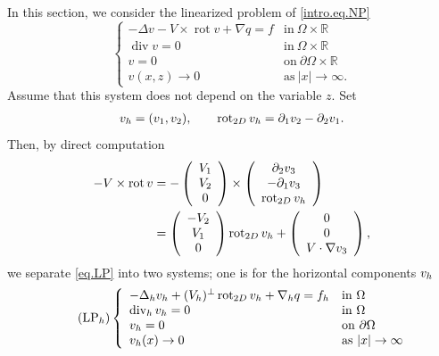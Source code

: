 \documentclass[11pt,a4paper]{article}
\numberwithin{equation}{section}
\newcommand{\R}{\mathbb{R}}
\newcommand{\opdiv}{\operatorname{div}}
\newcommand{\oprot}{\operatorname{rot}}
\newcommand{\h}{{\rm h}}
\begin{document}
In this section, we consider the linearized problem of \eqref{intro.eq.NP}
%
\begin{equation}\tag{LP}\label{eq.LP}
\left\{
\begin{array}{ll}
-\Delta v -V\times\oprot v + \nabla q = f&\mbox{in}\ \Omega\times\R \\
\opdiv v = 0&\mbox{in}\ \Omega\times\R \\
v= 0 &\mbox{on}\ \partial\Omega\times\R \\
v(x,z)\to0&\mbox{as}\ |x|\to\infty.
\end{array}\right.
\end{equation}
%
Assume that this system does not depend on the variable $z$. Set 
%
\begin{align}\label{def.op.h.1}
v_\h=(v_1,v_2), 
\qquad 
\oprot_{{\rm 2D}} v_\h 
= \partial_1 v_2 - \partial_2 v_1. 
\end{align}
%
Then, by direct computation 
%
\begin{align*}
-V\times\oprot v 
&= 
-\left(
\begin{array}{c}
V_1 \\
V_2  \\
0 
\end{array}
\right) 
\times 
\left(
\begin{array}{c}
\partial_2 v_3 \\
-\partial_1 v_3 \\
\oprot_{{\rm 2D}} v_\h 
\end{array}
\right) \\
&= 
\left(
\begin{array}{c}
-V_2  \\
V_1  \\
0 
\end{array}
\right) 
\oprot_{{\rm 2D}} v_\h
+ \left(
\begin{array}{c}
0 \\
0 \\
V\cdot\nabla v_3
\end{array}
\right), 
\end{align*}
%
we separate \eqref{eq.LP} into two systems; one is for the horizontal components $v_\h$ 
%
\begin{equation}\tag{LP$_\h$}\label{eq.LPh}
\left\{
\begin{array}{ll}
-\Delta_\h v_\h + (V_\h)^\bot \oprot_{{\rm 2D}} v_\h + \nabla_\h q 
= f_\h&\mbox{in}\ \Omega \\
\opdiv_\h v_\h = 0&\mbox{in}\ \Omega \\
v_\h = 0 &\mbox{on}\ \partial\Omega \\
v_\h(x)\to0&\mbox{as}\ |x|\to\infty 
\end{array}\right.
\end{equation}
\end{document}
